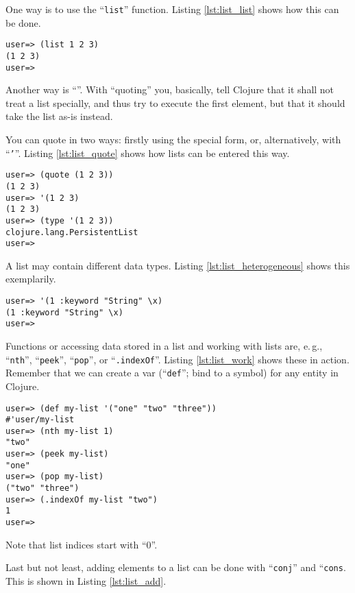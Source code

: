 One way is to use the ``\texttt{list}'' function.
Listing \ref{lst:list_list} shows how this can be done.

\begin{lstlisting}[label=lst:list_list, caption=Create a list.]
user=> (list 1 2 3)
(1 2 3)
user=> 
\end{lstlisting}

Another way is ``''.
With ``quoting'' you, basically, tell Clojure that it shall not treat a list specially, and thus try to execute the first element,
but that it should take the list as-is instead.

You can quote in two ways:
firstly using the  special form,
or, alternatively, with ``\texttt{'}''.
Listing \vref{lst:list_quote} shows how lists can be entered this way.

\begin{lstlisting}[label=lst:list_quote, caption=Enter lists using quoting.]
user=> (quote (1 2 3))
(1 2 3)
user=> '(1 2 3)
(1 2 3)
user=> (type '(1 2 3))
clojure.lang.PersistentList
user=> 
\end{lstlisting}

A list may contain different data types.
Listing \vref{lst:list_heterogeneous} shows this exemplarily.

\begin{lstlisting}[label=lst:list_heterogeneous, caption=A List Containing Different Data Types]
user=> '(1 :keyword "String" \x)
(1 :keyword "String" \x)
user=> 
\end{lstlisting}

Functions or accessing data stored in a list and working with lists are, e.\,g., ``\texttt{nth}'', ``\texttt{peek}'', ``\texttt{pop}'', or ``\texttt{.indexOf}''.
Listing \vref{lst:list_work} shows these in action.
Remember that we can create a var (``\texttt{def}''; bind to a symbol) for any entity in Clojure.

\begin{lstlisting}[label=lst:list_work, caption=Work with a list.]
user=> (def my-list '("one" "two" "three"))
#'user/my-list
user=> (nth my-list 1)
"two"
user=> (peek my-list)
"one"
user=> (pop my-list)
("two" "three")
user=> (.indexOf my-list "two")
1
user=> 
\end{lstlisting}

Note that list indices start with ``0''.

Last but not least, adding elements to a list can be done with ``\texttt{conj}'' and ``\texttt{cons}.
This is shown in Listing \vref{lst:list_add}.

